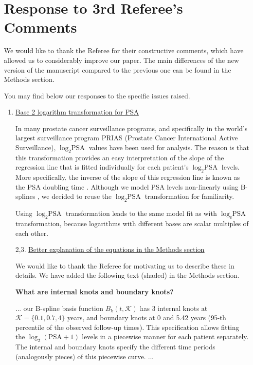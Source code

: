 \clearpage
\section*{Response to 3rd Referee's Comments}
We would like to thank the Referee for their constructive comments, which have allowed us to considerably improve our paper. The main differences of the new version of the manuscript compared to the previous one can be found in the Methods section.

You may find below our responses to the specific issues raised.

\begin{enumerate}
    \item \underline{Base 2 logarithm transformation for PSA}

    In many prostate cancer surveillance programs, and specifically in the world's largest surveillance program PRIAS (Prostate Cancer International Active Surveillance), $\log_2 \mbox{PSA}$ values have been used for analysis. The reason is that this transformation provides an easy interpretation of the slope of the regression line that is fitted individually for each patient's $\log_2 \mbox{PSA}$ levels. More specifically, the inverse of the slope of this regression line is known as the PSA doubling time \citep{ROBERTS2001576}. Although we model PSA levels non-linearly using B-splines \citep{de1978practical}, we decided to reuse the $\log_2 \mbox{PSA}$ transformation for familiarity. 

    Using $\log_2 \mbox{PSA}$ transformation leads to the same model fit as with $\log_{\mathrm{e}} \mbox{PSA}$ transformation, because logarithms with different bases are scalar multiples of each other.

    \item[2,3.] \underline{Better explanation of the equations in the Methods section}

    We would like to thank the Referee for motivating us to describe these in details. We have added the following text (shaded) in the Methods section.

    \textbf{What are internal knots and boundary knots?}
    \begin{shadequote}
    ... our B-spline basis function $B_k(t, \mathcal{K})$ has 3 internal knots at $\mathcal{K} = \{0.1, 0.7, 4\}$ years, and boundary knots at 0 and 5.42 years (95-th percentile of the observed follow-up times). This specification allows fitting the $\log_2 (\mbox{PSA} + 1)$ levels in a piecewise manner for each patient separately. The internal and boundary knots specify the different time periods (analogously pieces) of this piecewise curve. ...
    \end{shadequote}


\end{enumerate}

